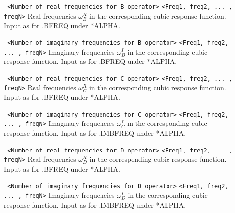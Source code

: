 \begin{description}
\item[] \verb| | \newline
\verb|<Number of real frequencies for B operator>|\newline
\verb|<Freq1, freq2, ... , freqN>|\newline
Real frequencies $\omega_B^R$ in the corresponding cubic response function.
Input as for .BFREQ under *ALPHA.
\item[] \verb| | \newline
\verb|<Number of imaginary frequencies for B operator>|\newline
\verb|<Freq1, freq2, ... , freqN>|\newline
Imaginary frequencies $\omega_B^I$ in the corresponding cubic response function.
Input as for .BFREQ under *ALPHA.
\item[] \verb| | \newline
\verb|<Number of real frequencies for C operator>|\newline
\verb|<Freq1, freq2, ... , freqN>|\newline
Real frequencies $\omega_C^R$ in the corresponding cubic response function.
Input as for .BFREQ under *ALPHA.
\item[] \verb| | \newline
\verb|<Number of imaginary frequencies for C operator>|\newline
\verb|<Freq1, freq2, ... , freqN>|\newline
Imaginary frequencies $\omega_C^I$ in the corresponding cubic response function.
Input as for .IMBFREQ under *ALPHA.
\item[] \verb| | \newline
\verb|<Number of real frequencies for D operator>|\newline
\verb|<Freq1, freq2, ... , freqN>|\newline
Real frequencies $\omega_D^R$ in the corresponding cubic response function.
Input as for .BFREQ under *ALPHA.
\item[] \verb| | \newline
\verb|<Number of imaginary frequencies for D operator>|\newline
\verb|<Freq1, freq2, ... , freqN>|\newline
Imaginary frequencies $\omega_D^I$ in the corresponding cubic response function.
Input as for .IMBFREQ under *ALPHA.
\end{description}


